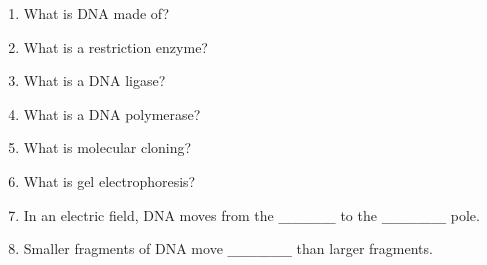 \begin{enumerate}
\def\labelenumi{\arabic{enumi}.}
\tightlist
\item
  What is DNA made of?
\item
  What is a restriction enzyme?
\item
  What is a DNA ligase?
\item
  What is a DNA polymerase?
\item
  What is molecular cloning?
\item
  What is gel electrophoresis?
\item
  In an electric field, DNA moves from the \texttt{\_\_\_\_\_\_\_\_} to the \texttt{\_\_\_\_\_\_\_\_\_} pole.
\item
  Smaller fragments of DNA move \texttt{\_\_\_\_\_\_\_\_\_} than larger fragments.
\end{enumerate}


